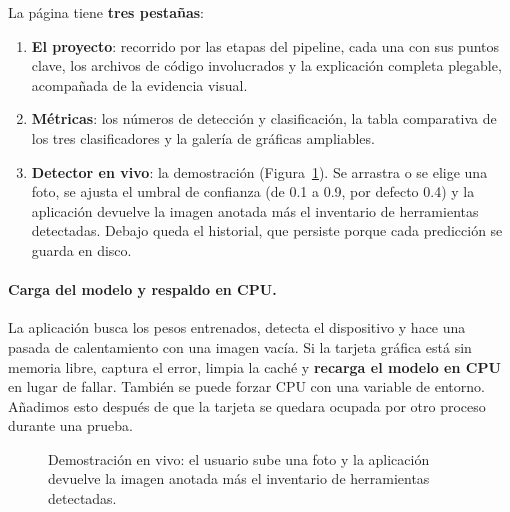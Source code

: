 \documentclass[11pt,a4paper]{article}
\begin{document}
La página tiene \textbf{tres pestañas}:

\begin{enumerate}
  \item \textbf{El proyecto}: recorrido por las etapas del pipeline, cada una con sus puntos clave,
        los archivos de código involucrados y la explicación completa plegable, acompañada de la
        evidencia visual.
  \item \textbf{Métricas}: los números de detección y clasificación, la tabla comparativa de los
        tres clasificadores y la galería de gráficas ampliables.
  \item \textbf{Detector en vivo}: la demostración (Figura~\ref{fig:demo}). Se arrastra o se elige
        una foto, se ajusta el umbral de confianza (de 0.1 a 0.9, por defecto 0.4) y la aplicación
        devuelve la imagen anotada más el inventario de herramientas detectadas. Debajo queda el
        historial, que persiste porque cada predicción se guarda en disco.
\end{enumerate}

\paragraph{Carga del modelo y respaldo en CPU.}
La aplicación busca los pesos entrenados, detecta el dispositivo y hace una pasada de calentamiento
con una imagen vacía. Si la tarjeta gráfica está sin memoria libre, captura el error, limpia la
caché y \textbf{recarga el modelo en CPU} en lugar de fallar. También se puede forzar CPU con una
variable de entorno. Añadimos esto después de que la tarjeta se quedara ocupada por otro proceso
durante una prueba.

\begin{figure}[htbp]
  \centering
  \caption{Demostración en vivo: el usuario sube una foto y la aplicación devuelve la imagen
  anotada más el inventario de herramientas detectadas.}
  \label{fig:demo}
\end{figure}
\end{document}

